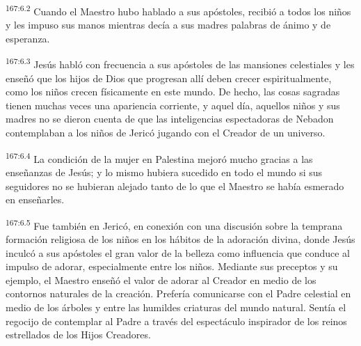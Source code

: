 \par 
\textsuperscript{167:6.2} Cuando el Maestro hubo hablado a sus apóstoles, recibió a todos los niños y les impuso sus manos mientras decía a sus madres palabras de ánimo y de esperanza.

\par 
\textsuperscript{167:6.3} Jesús habló con frecuencia a sus apóstoles de las mansiones celestiales y les enseñó que los hijos de Dios que progresan allí deben crecer espiritualmente, como los niños crecen físicamente en este mundo. De hecho, las cosas sagradas tienen muchas veces una apariencia corriente, y aquel día, aquellos niños y sus madres no se dieron cuenta de que las inteligencias espectadoras de Nebadon contemplaban a los niños de Jericó jugando con el Creador de un universo.

\par 
\textsuperscript{167:6.4} La condición de la mujer en Palestina mejoró mucho gracias a las enseñanzas de Jesús; y lo mismo hubiera sucedido en todo el mundo si sus seguidores no se hubieran alejado tanto de lo que el Maestro se había esmerado en enseñarles.

\par 
\textsuperscript{167:6.5} Fue también en Jericó, en conexión con una discusión sobre la temprana formación religiosa de los niños en los hábitos de la adoración divina, donde Jesús inculcó a sus apóstoles el gran valor de la belleza como influencia que conduce al impulso de adorar, especialmente entre los niños. Mediante sus preceptos y su ejemplo, el Maestro enseñó el valor de adorar al Creador en medio de los contornos naturales de la creación. Prefería comunicarse con el Padre celestial en medio de los árboles y entre las humildes criaturas del mundo natural. Sentía el regocijo de contemplar al Padre a través del espectáculo inspirador de los reinos estrellados de los Hijos Creadores.

